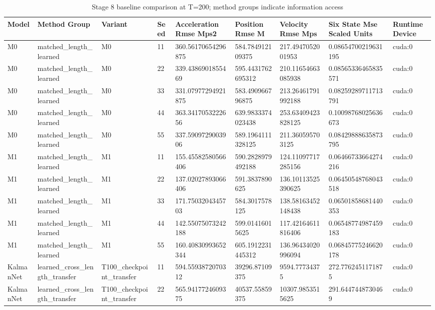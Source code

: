 \begin{table}[t]
\centering
\caption{Stage 8 baseline comparison at T=200; method groups indicate information access}
\label{tab:stage8T200}
\scriptsize
\begin{tabular}{lllllllll}
\hline
Model & Method Group & Variant & Seed & Acceleration Rmse Mps2 & Position Rmse M & Velocity Rmse Mps & Six State Mse Scaled Units & Runtime Device \\
\hline
M0 & matched\_length\_learned & M0 & 11 & 360.56170654296875 & 584.784912109375 & 217.4947052001953 & 0.08654700219631195 & cuda:0 \\
M0 & matched\_length\_learned & M0 & 22 & 339.4386901855469 & 595.4431762695312 & 210.11654663085938 & 0.08565336465835571 & cuda:0 \\
M0 & matched\_length\_learned & M0 & 33 & 331.07977294921875 & 583.490966796875 & 213.26461791992188 & 0.08259289711713791 & cuda:0 \\
M0 & matched\_length\_learned & M0 & 44 & 363.3417053222656 & 639.9833374023438 & 253.63409423828125 & 0.10098768025636673 & cuda:0 \\
M0 & matched\_length\_learned & M0 & 55 & 337.5909729003906 & 589.1964111328125 & 211.360595703125 & 0.08429888635873795 & cuda:0 \\
M1 & matched\_length\_learned & M1 & 11 & 155.45582580566406 & 590.2828979492188 & 124.11097717285156 & 0.06466733664274216 & cuda:0 \\
M1 & matched\_length\_learned & M1 & 22 & 137.02027893066406 & 591.3837890625 & 136.10113525390625 & 0.06450548768043518 & cuda:0 \\
M1 & matched\_length\_learned & M1 & 33 & 171.7503204345703 & 584.3017578125 & 138.58163452148438 & 0.06501858681440353 & cuda:0 \\
M1 & matched\_length\_learned & M1 & 44 & 142.55075073242188 & 599.01416015625 & 117.42164611816406 & 0.06548774987459183 & cuda:0 \\
M1 & matched\_length\_learned & M1 & 55 & 160.40830993652344 & 605.1912231445312 & 136.96434020996094 & 0.06845775246620178 & cuda:0 \\
KalmanNet & learned\_cross\_length\_transfer & T100\_checkpoint\_transfer & 11 & 594.5593872070312 & 39296.87109375 & 9594.77734375 & 272.7762451171875 & cuda:0 \\
KalmanNet & learned\_cross\_length\_transfer & T100\_checkpoint\_transfer & 22 & 565.9417724609375 & 40537.55859375 & 10307.9853515625 & 291.6447448730469 & cuda:0 \\

\end{tabular}
\end{table}
